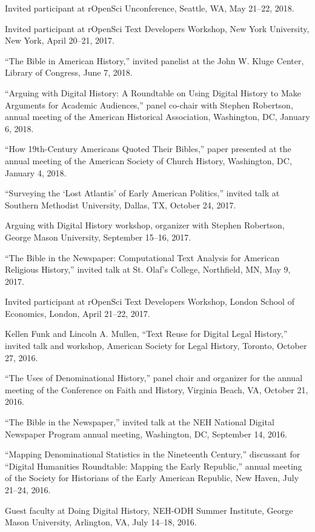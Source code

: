 \documentclass[11pt]{article}
\begin{document}
Invited participant at rOpenSci Unconference, Seattle, WA, May 21--22, 2018.

Invited participant at rOpenSci Text Developers Workshop, New York University, 
New York, April 20--21, 2017.

``The Bible in American History,'' invited panelist at the John W. Kluge Center, 
Library of Congress, June 7, 2018.

``Arguing with Digital History: A Roundtable on Using Digital History to Make 
Arguments for Academic Audiences,'' panel co-chair with Stephen Robertson, 
annual meeting of the American Historical Association, Washington, DC, January 
6, 2018.

``How 19th-Century Americans Quoted Their Bibles,'' paper presented at the 
annual meeting of the American Society of Church History, Washington, DC, 
January 4, 2018.

``Surveying the `Lost Atlantis' of Early American Politics,'' invited talk at 
Southern Methodist University, Dallas, TX, October 24, 2017.

Arguing with Digital History workshop, organizer with Stephen Robertson, 
George Mason University, September 15--16, 2017.

``The Bible in the Newspaper: Computational Text Analysis for American 
Religious History,'' invited talk at St. Olaf's College, Northfield, MN, May 
9, 2017.

Invited participant at rOpenSci Text Developers Workshop, London School of Economics, London, April 21--22, 2017.

Kellen Funk and Lincoln A. Mullen, ``Text Reuse for Digital Legal History,'' 
invited talk and workshop, American Society for Legal History, Toronto, October 27, 2016.

``The Uses of Denominational History,'' panel chair and organizer for the annual meeting of the Conference on Faith and History, Virginia Beach, VA, October 21, 2016.

``The Bible in the Newspaper,'' invited talk at the NEH National Digital Newspaper Program annual meeting, Washington, DC, September 14, 2016.

``Mapping Denominational Statistics in the Nineteenth Century,'' discussant 
for ``Digital Humanities Roundtable: Mapping the Early Republic,'' annual 
meeting of the Society for Historians of the Early American Republic, New 
Haven, July 21--24, 2016.

Guest faculty at Doing Digital History, NEH-ODH Summer Institute, George 
Mason University, Arlington, VA, July 14--18, 2016.
\end{document}
